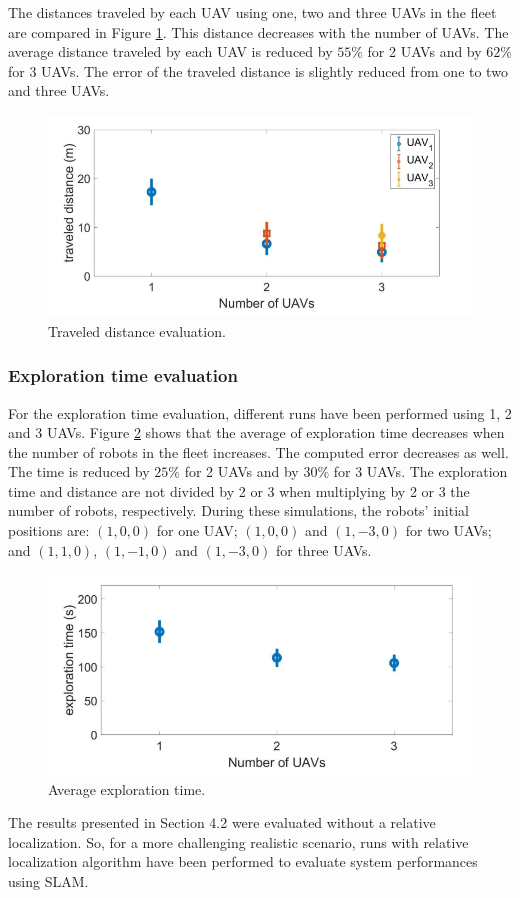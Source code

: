 \documentclass[11pt,openany]{book}
\begin{document}
The distances traveled by each UAV using one, two and three UAVs in the ﬂeet are compared in Figure \ref{fig:3.21}. This distance decreases with the number of UAVs. The average distance traveled by each UAV is reduced by $55\%$ for 2 UAVs and by $62\%$ for 3 UAVs. The error of the traveled distance is slightly reduced from one to two and three UAVs.
\begin{figure}[H]
    \centering
    \includegraphics[scale=0.4]{assets/3_21.png}
    \caption{Traveled distance evaluation.}
    \label{fig:3.21}
\end{figure}
\subsubsection{Exploration time evaluation}
For the exploration time evaluation, different runs have been performed using 1, 2 and 3 UAVs. Figure \ref{fig:3.22} shows that the average of exploration time decreases when the number of robots in the ﬂeet increases. The computed error decreases as well. The time is reduced by $25\%$ for 2 UAVs and by $30\%$ for 3 UAVs. The exploration time and distance are not divided by 2 or 3 when multiplying by 2 or 3 the number of robots, respectively. During these simulations, the robots’ initial positions are: $(1,0,0)$ for one UAV; $(1,0,0)$ and $(1,-3,0)$ for two UAVs; and $(1,1,0)$, $(1,-1,0)$ and $(1,-3,0)$ for three UAVs.
\begin{figure}[H]
    \centering
    \includegraphics[scale=0.4]{assets/3_22.png}
    \caption{Average exploration time.}
    \label{fig:3.22}
\end{figure}
The results presented in Section 4.2 were evaluated without a relative localization. So, for a more challenging realistic scenario, runs with relative localization algorithm have been performed to evaluate system performances using SLAM.
\end{document}
